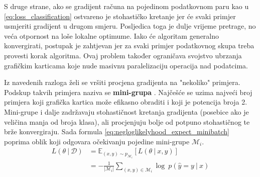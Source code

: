 \documentclass[times, utf8, numeric, diplomski]{fer}
\def\expect{\mathbb{E}}
\def\probsep{\ |\ }
\def\dataset{\mathcal{D}}
\def\minibatch{\mathcal{M}}
\begin{document}
S druge strane, ako se gradijent računa na pojedinom podatkovnom paru kao u \eqref{eq:loss_classification} ostvareno je stohastičko kretanje jer će svaki primjer usmjeriti gradijent u drugom smjeru. Posljedica toga je dulje vrijeme pretrage, no veća otpornost na loše lokalne optimume. Iako će algoritam generalno konvergirati, postupak je zahtjevan jer za svaki primjer podatkovnog skupa treba provesti korak algoritma. Ovaj problem također ograničava svojstvo ubrzanja grafičkim karticama koje nude masivnu paralelizaciju operacija nad podatcima.

Iz navedenih razloga želi se vršiti procjena gradijenta na "nekoliko" primjera. Podskup takvih primjera naziva se \textbf{mini-grupa} . Najčešće se uzima najveći broj primjera koji grafička kartica može efikasno obraditi i koji je potencija broja 2. Mini-grupe i dalje zadržavaju stohastičnost kretanja gradijenta (posebice ako je veličina manja od broja klasa), ali procjenjuju bolje od potpuno stohastičnog te brže konvergiraju. Sada formula \eqref{eq:negloglikelyhood_expect_minibatch} poprima oblik koji odgovara očekivanju pojedine mini-grupe $\minibatch_i$.
\begin{equation}
\label{eq:negloglikelyhood_expect_minibatch}
\begin{split}
L(\theta \probsep \dataset) &= \expect_{(x,y) \sim p_{\minibatch_i}}[L(\theta \probsep x,y)] \\
&= -\frac{1}{|\minibatch_i|} \sum_{(x,y)\in\minibatch_i} \log\ p(\hat{y}=y \probsep x)
\end{split}
\end{equation}
\end{document}
